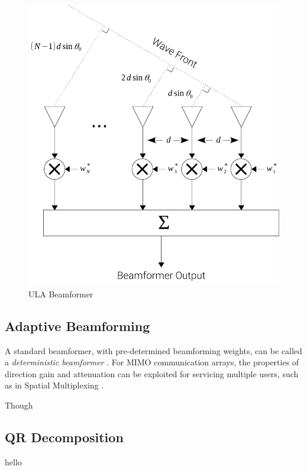 \begin{figure}[!htbp]
  \centering
  \includegraphics[]{02_abf_background/ula_beamformer}
  \caption{ULA Beamformer}
  \label{fig:ula_beamformer}
\end{figure}

\subsection{Adaptive Beamforming}

A standard beamformer, with pre-determined beamforming weights, can be called a \emph{deterministic beamformer} \citep{6206403}. For MIMO communication arrays, the properties of direction gain and attenuation can be exploited for servicing multiple users, such as in Spatial Multiplexing \citep{6732923}.

Though

\subsection{QR Decomposition}

hello \citep{AN506}



